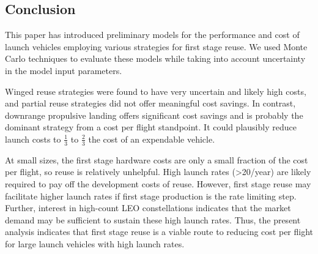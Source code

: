 \documentclass[conf]{new-aiaa}
\begin{document}
\begin{multicols}{2}
\section{Conclusion}

This paper has introduced preliminary models for the performance and cost of launch vehicles employing various strategies for first stage reuse. We used Monte Carlo techniques to evaluate these models while taking into account uncertainty in the model input parameters.

Winged reuse strategies were found to have very uncertain and likely high costs, and partial reuse strategies did not offer meaningful cost savings. In contrast, downrange propulsive landing offers significant cost savings and is probably the dominant strategy from a cost per flight standpoint. It could plausibly reduce launch costs to $\frac{1}{3}$ to $\frac{2}{3}$ the cost of an expendable vehicle.

At small sizes, the first stage hardware costs are only a small fraction of the cost per flight, so reuse is relatively unhelpful. High launch rates (>20/year) are likely required to pay off the development costs of reuse. However, first stage reuse may facilitate higher launch rates if first stage production is the rate limiting step. Further, interest in high-count LEO constellations indicates that the market demand may be sufficient to sustain these high launch rates. Thus, the present analysis indicates that first stage reuse is a viable route to reducing cost per flight for large launch vehicles with high launch rates. 


\end{multicols}
\end{document}
